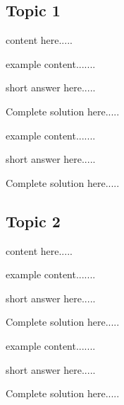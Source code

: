 \subsection*{Topic 1}
content here.....
\begin{example}
example content.......
    \begin{sol}
    short answer here.....
    \end{sol}
    \begin{solL}
    Complete solution here.....
    
    \end{solL}
    
\end{example}
\vspace{0.6in}
\begin{example}
example content.......
    \begin{sol}
    short answer here.....
    \end{sol}
    \begin{solL}
    Complete solution here.....
    
    \end{solL}
    
\end{example}
\vspace{0.6in}
\vspace{2in}
\subsection*{Topic 2}
content here.....
\begin{example}
example content.......
    \begin{sol}
    short answer here.....
    \end{sol}
    \begin{solL}
    Complete solution here.....
    
    \end{solL}
    
\end{example}
\vspace{0.6in}
\begin{example}
example content.......
    \begin{sol}
    short answer here.....
    \end{sol}
    \begin{solL}
    Complete solution here.....
    
    \end{solL}
    
\end{example}
\vspace{0.6in}







